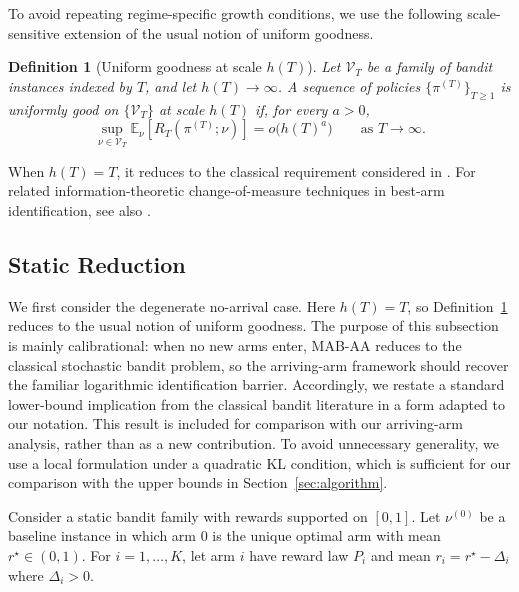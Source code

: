 \documentclass[
  12pt]{article}
\newtheorem{definition}{Definition}
\begin{document}
To avoid repeating regime-specific growth conditions, we use the following scale-sensitive extension of the usual notion of uniform goodness.

\begin{definition}[Uniform goodness at scale $h(T)$]
\label{def:uniformly-good-scale}
Let $\mathcal V_T$ be a family of bandit instances indexed by $T$, and let $h(T)\to\infty$.
A sequence of policies $\{\pi^{(T)}\}_{T\ge1}$ is \emph{uniformly good on $\{\mathcal V_T\}$ at
scale $h(T)$} if, for every $a>0$,
\[
\sup_{\nu\in\mathcal V_T}\mathbb E_{\nu}[R_T(\pi^{(T)};\nu)]
=
o\bigl(h(T)^a\bigr)
\qquad\text{as }T\to\infty.
\]
\end{definition} 


 When $h(T)=T$, it reduces to the classical requirement considered in \textcite{LAI19854,BurnetasKatehakis1996}. For related information-theoretic change-of-measure techniques in best-arm
identification, see also \textcite{KaufmannCappeGarivier2016}.

\subsection{Static Reduction}



We first consider the degenerate no-arrival case. Here $h(T)=T$, so
Definition~\ref{def:uniformly-good-scale} reduces to the usual notion of uniform goodness.
The purpose of this subsection is mainly calibrational: when no new arms enter, MAB-AA
reduces to the classical stochastic bandit problem, so the arriving-arm framework should
recover the familiar logarithmic identification barrier. Accordingly, we restate a standard
lower-bound implication from the classical bandit literature
\parencite{LAI19854,BurnetasKatehakis1996} in a form adapted to our notation. This result
is included for comparison with our arriving-arm analysis, rather than as a new contribution.
To avoid unnecessary generality, we use a local formulation under a quadratic KL condition,
which is sufficient for our comparison with the upper bounds in
Section~\ref{sec:algorithm}.

Consider a static bandit family with rewards supported on $[0,1]$. Let $\nu^{(0)}$ be a baseline
instance in which arm $0$ is the unique optimal arm with mean $r^\star\in(0,1)$. For
$i=1,\dots,K$, let arm $i$ have reward law $P_i$ and mean
\(
r_i=r^\star-\Delta_i\) where \(
\Delta_i>0.
\)
\end{document}
